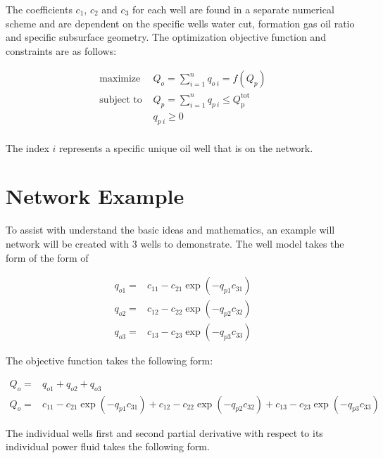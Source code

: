 \documentclass{article}
\begin{document}
The coefficients $c_{1}$, $c_{2}$ and $c_{3}$ for each well are found in a separate numerical scheme and are dependent on the specific wells water cut, formation gas oil ratio and specific subsurface geometry. The optimization objective function and constraints are as follows:

\begin{equation*}
\begin{aligned}
    \text{maximize } & Q_{o} = \sum_{i=1}^{n} q_{o\:i} = f(Q_{p}) \\
    \text{subject to } & Q_{p} = \sum_{i=1}^{n} q_{p\:i} \leq Q_{\text{p}}^{\text{tot}} \\
    & q_{p\:i} \geq 0 \\
\end{aligned}
\end{equation*}

The index $i$ represents a specific unique oil well that is on the network.

\section{Network Example}

To assist with understand the basic ideas and mathematics, an example will network will be created with 3 wells to demonstrate. The well model takes the form of the form of

\begin{equation*}
\begin{aligned}
    q_{o1} = & c_{11} - c_{21} \exp{(-q_{p1} c_{31})} \\
    q_{o2} = & c_{12} - c_{22} \exp{(-q_{p2} c_{32})} \\
    q_{o3} = & c_{13} - c_{23} \exp{(-q_{p3} c_{33})}
\end{aligned}
\end{equation*}

The objective function takes the following form:

\begin{equation*}
\begin{aligned}
    Q_{o} = & q_{o1} + q_{o2} +  q_{o3}\\
    Q_{o} = & c_{11} - c_{21} \exp{(-q_{p1} c_{31})} + c_{12} - c_{22} \exp{(-q_{p2} c_{32})} + c_{13} - c_{23} \exp{(-q_{p3} c_{33})}
\end{aligned}
\end{equation*}

The individual wells first and second partial derivative with respect to its individual power fluid takes the following form.
\end{document}
